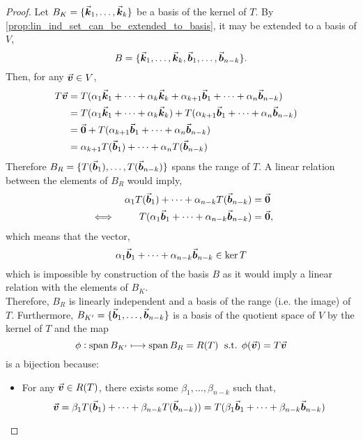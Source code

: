\documentclass[../MathsNotesBase.tex]{subfiles}
\begin{document}
{		
		\bigskip
		\begin{proof}
			Let ${ B_K = \{ \vec{\bm{k}}_1, \dots, \vec{\bm{k}}_k \} }$ be a basis of the kernel of $T$. By \autoref{prop:lin_ind_set_can_be_extended_to_basis}, it may be extended to a basis of $V$,
			\[ B = \{ \vec{\bm{k}}_1, \dots, \vec{\bm{k}}_k, \vec{\bm{b}}_1, \dots, \vec{\bm{b}}_{n-k} \}. \]
			Then, for any ${ \vec{\bm{v}} \in V }$,
			\[\begin{aligned}
				T\vec{\bm{v}} &= T(\alpha_1 \vec{\bm{k}}_1 + \cdots + \alpha_k \vec{\bm{k}}_k + \alpha_{k+1} \vec{\bm{b}}_1 + \cdots + \alpha_n \vec{\bm{b}}_{n-k}) \\
				&= T(\alpha_1 \vec{\bm{k}}_1 + \cdots + \alpha_k \vec{\bm{k}}_k) + T(\alpha_{k+1} \vec{\bm{b}}_1 + \cdots + \alpha_n \vec{\bm{b}}_{n-k}) &\text{\scriptsize{}} \\
				&= \vec{\bm{0}} + T(\alpha_{k+1} \vec{\bm{b}}_1 + \cdots + \alpha_n \vec{\bm{b}}_{n-k}) &\text{\scriptsize{}} \\
				&= \alpha_{k+1} T(\vec{\bm{b}}_1) + \cdots + \alpha_n T(\vec{\bm{b}}_{n-k}) &\text{\scriptsize{}} \\
			\end{aligned}\]
			Therefore ${ B_R = \{ T(\vec{\bm{b}}_1), \dots, T(\vec{\bm{b}}_{n-k}) \} }$ spans the range of $T$. A linear relation between the elements of $B_R$ would imply,
			\[\begin{aligned}
				&& \alpha_1 T(\vec{\bm{b}}_1) + \cdots + \alpha_{n-k} T(\vec{\bm{b}}_{n-k}) &= \vec{\bm{0}} \\
				&\iff & T(\alpha_1 \vec{\bm{b}}_1 + \cdots + \alpha_{n-k} \vec{\bm{b}}_{n-k}) &= \vec{\bm{0}},
			\end{aligned}\]
			which means that the vector,
			\[ \alpha_1 \vec{\bm{b}}_1 + \cdots + \alpha_{n-k} \vec{\bm{b}}_{n-k} \in \operatorname{ker} T \]
			which is impossible by construction of the basis $B$ as it would imply a linear relation with the elements of $B_K$.\\
			Therefore, $B_R$ is linearly independent and a basis of the range (i.e. the image) of $T$. Furthermore, ${ B_{K'} = \{  \vec{\bm{b}}_1, \dots, \vec{\bm{b}}_{n-k} \} }$  is a basis of the quotient space of $V$ by the kernel of $T$ and the map
			\[ \phi: \operatorname{span} B_{K'} \longmapsto \operatorname{span} B_R = R(T) \; \text{ s.t. } \phi(\vec{\bm{v}}) = T\vec{\bm{v}} \]
			is a bijection because:
			\begin{itemize}
				\item{For any ${ \vec{\bm{v}} \in R(T) }$, there exists some ${ \beta_1, \dots, \beta_{n-k} }$ such that,
					\[ \vec{\bm{v}} = \beta_1 T(\vec{\bm{b}}_1) + \cdots + \beta_{n-k} T(\vec{\bm{b}}_{n-k})) = T(\beta_1 \vec{\bm{b}}_1 + \cdots + \beta_{n-k} \vec{\bm{b}}_{n-k}) \]
}
\end{itemize}
\end{proof}}
\end{document}
